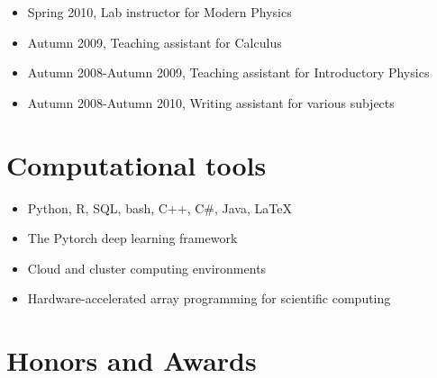 \documentclass[11pt,letterpaper,roman]{moderncv}        %
\begin{document}
{
\begin{itemize}
\item Spring 2010, Lab instructor for Modern Physics
\item Autumn 2009, Teaching assistant for Calculus
\item Autumn 2008-Autumn 2009, Teaching assistant for Introductory Physics
\item Autumn 2008-Autumn 2010, Writing assistant for various subjects
\end{itemize}
}

\section{Computational tools}
\begin{itemize}
\item Python, R, SQL, bash, C++, C\#, Java, LaTeX
\item The Pytorch deep learning framework
\item Cloud and cluster computing environments
\item Hardware-accelerated array programming for scientific computing
\end{itemize}

\section{Honors and Awards}


\clearpage
\end{document}

